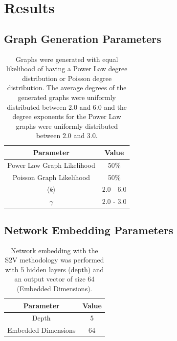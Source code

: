 \section{Results}
\vspace{-3em}
\subsection{Graph Generation Parameters}
\begin{table}[ht]
    \centering \footnotesize
    \begin{tabular}{||c | c ||} 
        \hline
        Parameter & Value\\ [0.5ex] 
        \hline\hline
        Power Law Graph Likelihood & 50\% \\ 
        \hline
        Poisson Graph Likelihood & 50\% \\ 
        \hline
        $\langle k \rangle$ & 2.0 - 6.0\\ 
        \hline
        $\gamma$ & 2.0 - 3.0\\ [1ex]
        \hline
    \end{tabular}
    \caption[Graph Generation Parameters]{Graphs were generated with equal likelihood of having a Power Law degree distribution or Poisson degree distribution. The average degrees of the generated graphs were uniformly distributed between 2.0 and 6.0 and the degree exponents for the Power Law graphs were uniformly distributed between 2.0 and 3.0.}
    \label{table:graph parameters}
\end{table}

\vspace{-3em}
\subsection{Network Embedding Parameters}
\begin{table}[ht]
    \centering \footnotesize
    \begin{tabular}{||c | c ||} 
        \hline
        Parameter & Value\\ [0.5ex] 
        \hline\hline
        Depth & 5\\ 
        \hline
        Embedded Dimensions & 64\\ [1ex]
        \hline
    \end{tabular}
    \caption[Graph Generation Parameters]{Network embedding with the S2V methodology was performed with 5 hidden layers (depth) and an output vector of size 64 (Embedded Dimensions).}
    \label{table:network embeding parameters}
\end{table}

